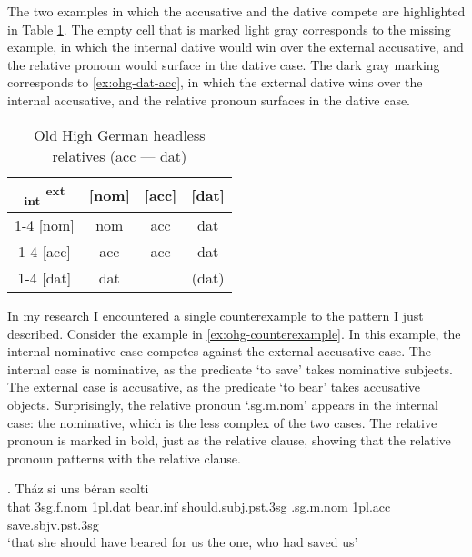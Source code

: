 The two examples in which the accusative and the dative compete are highlighted in Table \ref{tbl:summary-old-high-german-acc-dat}. The empty cell that is marked light gray corresponds to the missing example, in which the internal dative would win over the external accusative, and the relative pronoun would surface in the dative case. The dark gray marking corresponds to \ref{ex:ohg-dat-acc}, in which the external dative wins over the internal accusative, and the relative pronoun surfaces in the dative case.

\begin{table}[ht]
  \center
  \caption{Old High German headless relatives (\ac{acc} --- \ac{dat})}
  \begin{tabular}{c|c|c|c}
    \toprule
        \textsubscript{\ac{int}} \textsuperscript{\ac{ext}}
          & [\ac{nom}]
          & [\ac{acc}]
          & [\ac{dat}]
          \\ \cmidrule{1-4}
      [\ac{nom}]
          & \ac{nom}
          & \ac{acc}
          & \ac{dat}
          \\ \cmidrule{1-4}
      [\ac{acc}]
          & \ac{acc}
          & \ac{acc}
          & \cellcolor{DG}\ac{dat}
          \\ \cmidrule{1-4}
      [\ac{dat}]
          & \ac{dat}
          & \cellcolor{LG}
          & (\ac{dat})
          \\
    \bottomrule
  \end{tabular}
    \label{tbl:summary-old-high-german-acc-dat}
\end{table}

In my research I encountered a single counterexample to the pattern I just described.
Consider the example in \ref{ex:ohg-counterexample}. In this example, the internal nominative case competes against the external accusative case.
The internal case is nominative, as the predicate  `to save' takes nominative subjects.
The external case is accusative, as the predicate  `to bear' takes accusative objects.
Surprisingly, the relative pronoun  `.\ac{sg}.\ac{m}.\ac{nom}' appears in the internal case: the nominative, which is the less complex of the two cases. The relative pronoun is marked in bold, just as the relative clause, showing that the relative pronoun patterns with the relative clause.

\exg. Tház si uns béran scolti   \\
 that 3\ac{sg}.\ac{f}.\ac{nom} 1\ac{pl}.\ac{dat} bear.\ac{inf}\scsub{[acc]} should.\ac{subj}.\ac{pst}.3\ac{sg} .\ac{sg}.\ac{m}.\ac{nom} 1\ac{pl}.\ac{acc} save.\ac{sbjv}.\ac{pst}.3\ac{sg}\scsub{[nom]}\\
 `that she should have beared for us the one, who had saved us' \label{ex:ohg-counterexample}

